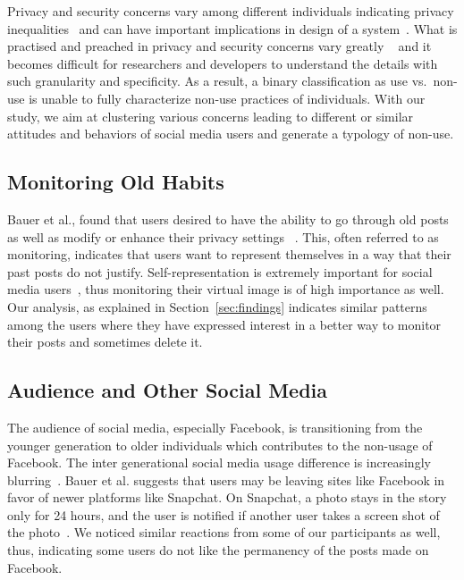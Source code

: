 Privacy and security concerns vary among different individuals indicating privacy inequalities~\cite{litt2013understanding,kang2015my} and can have important implications in design of a system~\cite{dupree2016privacy}. What is practised and preached in privacy and security concerns vary greatly ~\cite{phelan2016s} and it becomes difficult for researchers and developers to understand the details with such granularity and specificity. As a result, a binary classification as use vs.\ non-use is unable to fully characterize non-use practices of individuals. With our study, we aim at clustering various concerns leading to different or similar attitudes and behaviors of social media users and generate a typology of non-use.

\subsection{Monitoring Old Habits}
Bauer et al., found that users desired to have the ability to go through old posts as well as modify or enhance their privacy settings ~\cite{bauer2013post}. This, often referred to as monitoring, indicates that users want to represent themselves in a way that their past posts do not justify. Self-representation is extremely important for social media users~\cite{dimicco2007identity,zhao2008identity}, thus monitoring their virtual image is of high importance as well. Our analysis, as explained in Section~\ref{sec:findings} indicates similar patterns among the users where they have expressed interest in a better way to monitor their posts and sometimes delete it.

\subsection{Audience and Other Social Media}
The audience of social media, especially Facebook, is transitioning from the younger generation to older individuals which contributes to the non-usage of Facebook. The inter generational social media usage difference is increasingly blurring~\cite{bucur1999older}. Bauer et al. suggests that users may be leaving sites like Facebook in favor of newer platforms like Snapchat. On Snapchat, a photo stays in the story only for 24 hours, and the user is notified if another user takes a screen shot of the photo~\cite{bauer2013post}. We noticed similar reactions from some of our participants as well, thus, indicating some users do not like the permanency of the posts made on Facebook. 

